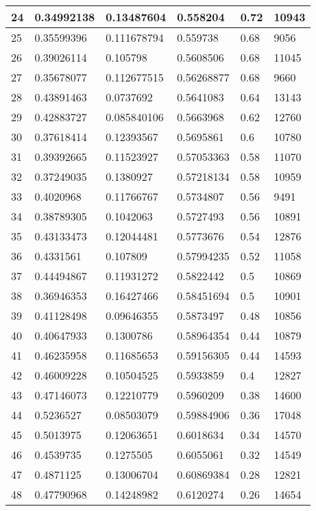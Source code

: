 \begin{longtable}{|l|l|l|l|l|l|}
24 & 0.34992138 & 0.13487604 & 0.558204 & 0.72 & 10943 \\ \hline 
25 & 0.35599396 & 0.111678794 & 0.559738 & 0.68 & 9056 \\ \hline 
26 & 0.39026114 & 0.105798 & 0.5608506 & 0.68 & 11045 \\ \hline 
27 & 0.35678077 & 0.112677515 & 0.56268877 & 0.68 & 9660 \\ \hline 
28 & 0.43891463 & 0.0737692 & 0.5641083 & 0.64 & 13143 \\ \hline 
29 & 0.42883727 & 0.085840106 & 0.5663968 & 0.62 & 12760 \\ \hline 
30 & 0.37618414 & 0.12393567 & 0.5695861 & 0.6 & 10780 \\ \hline 
31 & 0.39392665 & 0.11523927 & 0.57053363 & 0.58 & 11070 \\ \hline 
32 & 0.37249035 & 0.1380927 & 0.57218134 & 0.58 & 10959 \\ \hline 
33 & 0.4020968 & 0.11766767 & 0.5734807 & 0.56 & 9491 \\ \hline 
34 & 0.38789305 & 0.1042063 & 0.5727493 & 0.56 & 10891 \\ \hline 
35 & 0.43133473 & 0.12044481 & 0.5773676 & 0.54 & 12876 \\ \hline 
36 & 0.4331561 & 0.107809 & 0.57994235 & 0.52 & 11058 \\ \hline 
37 & 0.44494867 & 0.11931272 & 0.5822442 & 0.5 & 10869 \\ \hline 
38 & 0.36946353 & 0.16427466 & 0.58451694 & 0.5 & 10901 \\ \hline 
39 & 0.41128498 & 0.09646355 & 0.5873497 & 0.48 & 10856 \\ \hline 
40 & 0.40647933 & 0.1300786 & 0.58964354 & 0.44 & 10879 \\ \hline 
41 & 0.46235958 & 0.11685653 & 0.59156305 & 0.44 & 14593 \\ \hline 
42 & 0.46009228 & 0.10504525 & 0.5933859 & 0.4 & 12827 \\ \hline 
43 & 0.47146073 & 0.12210779 & 0.5960209 & 0.38 & 14600 \\ \hline 
44 & 0.5236527 & 0.08503079 & 0.59884906 & 0.36 & 17048 \\ \hline 
45 & 0.5013975 & 0.12063651 & 0.6018634 & 0.34 & 14570 \\ \hline 
46 & 0.4539735 & 0.1275505 & 0.6055061 & 0.32 & 14549 \\ \hline 
47 & 0.4871125 & 0.13006704 & 0.60869384 & 0.28 & 12821 \\ \hline 
48 & 0.47790968 & 0.14248982 & 0.6120274 & 0.26 & 14654 \\ \hline 

\end{longtable}
